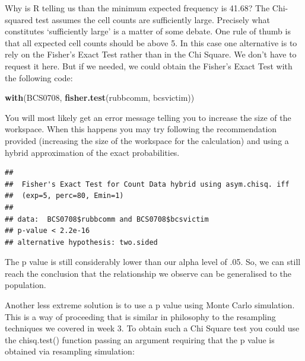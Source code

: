 \documentclass[]{book}
\newenvironment{Shaded}{\begin{snugshade}}{\end{snugshade}}
\newcommand{\DataTypeTok}[1]{\textcolor[rgb]{0.13,0.29,0.53}{#1}}
\newcommand{\FloatTok}[1]{\textcolor[rgb]{0.00,0.00,0.81}{#1}}
\newcommand{\KeywordTok}[1]{\textcolor[rgb]{0.13,0.29,0.53}{\textbf{#1}}}
\newcommand{\NormalTok}[1]{#1}
\newcommand{\OperatorTok}[1]{\textcolor[rgb]{0.81,0.36,0.00}{\textbf{#1}}}
\newcommand{\OtherTok}[1]{\textcolor[rgb]{0.56,0.35,0.01}{#1}}
\theoremstyle{definition}
\theoremstyle{definition}
\theoremstyle{definition}
\theoremstyle{remark}
\begin{document}
Why is R telling us than the minimum expected frequency is 41.68? The
Chi-squared test assumes the cell counts are sufficiently large.
Precisely what constitutes `sufficiently large' is a matter of some
debate. One rule of thumb is that all expected cell counts should be
above 5. In this case one alternative is to rely on the Fisher's Exact
Test rather than in the Chi Square. We don't have to request it here.
But if we needed, we could obtain the Fisher's Exact Test with the
following code:

\begin{Shaded}
\begin{Highlighting}[]
\KeywordTok{with}\NormalTok{(BCS0708, }\KeywordTok{fisher.test}\NormalTok{(rubbcomm, bcsvictim))}
\end{Highlighting}
\end{Shaded}

You will most likely get an error message telling you to increase the
size of the workspace. When this happens you may try following the
recommendation provided (increasing the size of the workspace for the
calculation) and using a hybrid approximation of the exact
probabilities.

\begin{Shaded}
\end{Shaded}

\begin{verbatim}
## 
##  Fisher's Exact Test for Count Data hybrid using asym.chisq. iff
##  (exp=5, perc=80, Emin=1)
## 
## data:  BCS0708$rubbcomm and BCS0708$bcsvictim
## p-value < 2.2e-16
## alternative hypothesis: two.sided
\end{verbatim}

The p value is still considerably lower than our alpha level of .05. So,
we can still reach the conclusion that the relationship we observe can
be generalised to the population.

Another less extreme solution is to use a p value using Monte Carlo
simulation. This is a way of proceeding that is similar in philosophy to
the resampling techniques we covered in week 3. To obtain such a Chi
Square test you could use the chisq.test() function passing an argument
requiring that the p value is obtained via resampling simulation:
\end{document}
